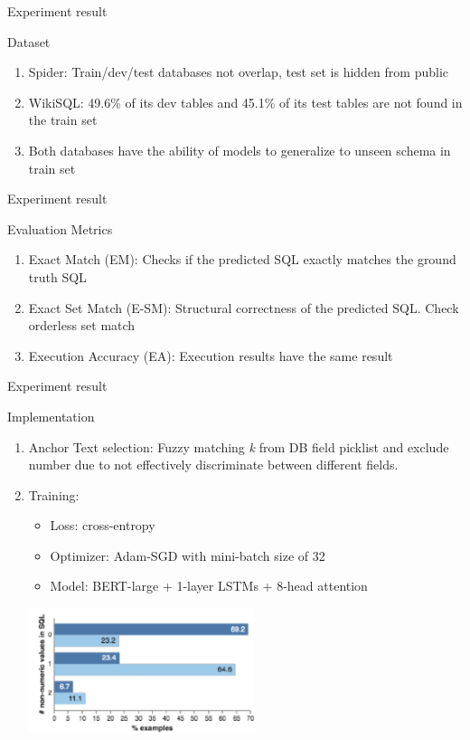 \documentclass{beamer}
\begin{document}
\begin{frame}[t]{Experiment result}\vspace{10pt}
\begin{block}{Dataset}
\begin{enumerate}
\item Spider: Train/dev/test databases not overlap, test set is hidden from public
\item WikiSQL: 49.6\% of its dev tables and 45.1\% of its test tables are not found in the train set
\item Both databases have the ability of models to generalize to unseen schema in train set
\end{enumerate}
\end{block}
\end{frame}

\begin{frame}[t]{Experiment result}\vspace{10pt}
\begin{block}{Evaluation Metrics}
\begin{enumerate}
\item Exact Match (EM): Checks if the predicted SQL exactly matches the ground truth SQL
\item Exact Set Match (E-SM): Structural correctness of the predicted SQL. Check orderless set match
\item Execution Accuracy (EA): Execution results have the same result
\end{enumerate}
\end{block}
\end{frame}

\begin{frame}[t]{Experiment result}\vspace{10pt}
\begin{block}{Implementation}
\begin{enumerate}
\item Anchor Text selection: Fuzzy matching \emph{k} from DB field picklist and exclude number due to not effectively discriminate between different fields. 
\pause
\item Training: 
\begin{itemize}
\item Loss: cross-entropy
\pause
\item Optimizer: Adam-SGD with mini-batch size of 32
\pause
\item Model: BERT-large + 1-layer LSTMs + 8-head attention
\end{itemize}
\includegraphics{non-numeric}
\end{enumerate}
\end{block}
\end{frame}
\end{document}
